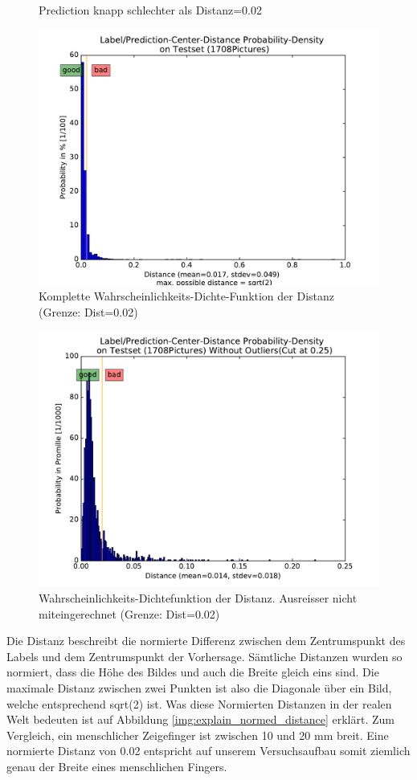 \begin{figure}
\begin{minipage}[b]{0.48\textwidth}
	\end{minipage}
	\caption{Prediction knapp schlechter als Distanz=0.02}	
	\label{img:distanz_knapp_schlecht}
\end{figure}

\begin{figure}	
	\centering
	\includegraphics[width=.7\textwidth]{Kapitel/70Resultate/Bilder/distProbDensity.pdf}
	\caption{Komplette Wahrscheinlichkeits-Dichte-Funktion der Distanz (Grenze: Dist=0.02)}
	\label{img:dist_dichte}
\end{figure}
\begin{figure}	
	\centering
	\includegraphics[width=.7\textwidth]{Kapitel/70Resultate/Bilder/distProbDensity_improved.pdf}
	\caption{Wahrscheinlichkeits-Dichtefunktion der Distanz. Ausreisser nicht miteingerechnet (Grenze: Dist=0.02)}
	\label{img:dist_dichte_improved}
\end{figure}

Die Distanz beschreibt die normierte Differenz zwischen dem Zentrumspunkt des Labels und dem Zentrumspunkt der Vorhersage. 
Sämtliche Distanzen wurden so normiert, dass die Höhe des Bildes und auch die Breite gleich eins sind. 
Die maximale Distanz zwischen zwei Punkten ist also die Diagonale über ein Bild, welche entsprechend sqrt(2) ist.
Was diese Normierten Distanzen in der realen Welt bedeuten ist auf Abbildung \ref{img:explain_normed_distance} erklärt. 
Zum Vergleich, ein menschlicher Zeigefinger ist zwischen 10 und 20 mm breit.
Eine normierte Distanz von 0.02 entspricht auf unserem Versuchsaufbau somit ziemlich genau der Breite eines menschlichen Fingers. 

